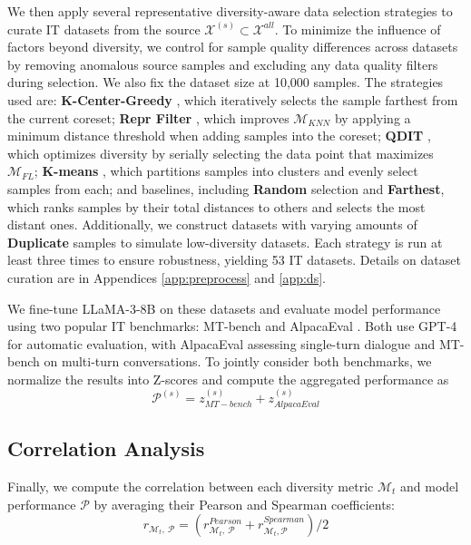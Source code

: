We then apply several representative diversity-aware data selection strategies to curate IT datasets from the source $\mathcal{X}^{(s)} \subset \mathcal{X}^{all}$. 
To minimize the influence of factors beyond diversity, we control for sample quality differences across datasets by removing anomalous source samples and excluding any data quality filters during selection. We also fix the dataset size at 10,000 samples. 
The strategies used are: \textbf{K-Center-Greedy} \cite{sener2017active-Kcentergreedy, chen2023maybe-Kcentergreedy, du2023mods-Kcentergreedy, wu2023self-Kcentergreedy}, which iteratively selects the sample farthest from the current coreset; \textbf{Repr Filter} \cite{liu2023makes}, which improves $\mathcal{M}_{KNN}$ by applying a minimum distance threshold when adding samples into the coreset; \textbf{QDIT} \cite{bukharin2023data-QDIT}, which optimizes diversity by serially selecting the data point that maximizes $\mathcal{M}_{FL}$; \textbf{K-means} \cite{song2024iterselecttune-Kmeans}, which partitions samples into clusters and evenly select samples from each; and baselines, including \textbf{Random} selection and \textbf{Farthest}, which ranks samples by their total distances to others and selects the most distant ones. Additionally, we construct datasets with varying amounts of \textbf{Duplicate} samples to simulate low-diversity datasets. Each strategy is run at least three times to ensure robustness, yielding 53 IT datasets. 
Details on dataset curation are in Appendices \ref{app:preprocess} and \ref{app:ds}.

We fine-tune LLaMA-3-8B \cite{dubey2024llama} on these datasets and evaluate model performance using two popular IT benchmarks: MT-bench \cite{zheng2023judging-MT-Bench} and AlpacaEval \cite{li2023alpacaeval}. Both use GPT-4 \cite{achiam2023gpt} for automatic evaluation, with AlpacaEval assessing single-turn dialogue and MT-bench on multi-turn conversations. 
To jointly consider both benchmarks, we normalize the results into Z-scores and compute the aggregated performance as 
\begin{equation}
\label{eq:perf}
    \mathcal{P}^{(s)} = z^{(s)}_{MT-bench} + z^{(s)}_{AlpacaEval}
\end{equation}




\subsection{Correlation Analysis}
\label{subsec:analysis}
Finally, we compute the correlation between each diversity metric $\mathcal{M}_{t}$ and model performance $\mathcal{P}$ by averaging their Pearson and Spearman coefficients:
\begin{equation}
\label{eq:cor}
    r_{\mathcal{M}_{t},\ \mathcal{P}} = (r_{\mathcal{M}_{t},\ \mathcal{P}}^{Pearson} + r_{\mathcal{M}_{t},\mathcal{P}}^{Spearman})/{2}
\end{equation}

